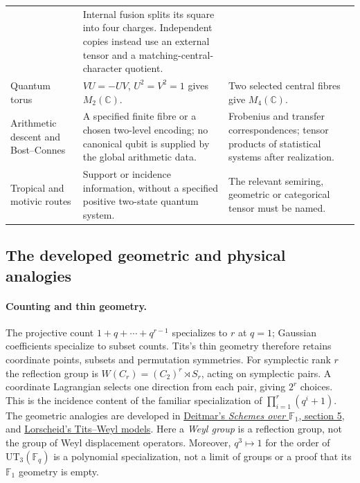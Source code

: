 \begin{longtable}{@{}p{3.1cm}p{5.1cm}p{6.5cm}@{}}
& Internal fusion splits its square into four charges. Independent copies
instead use an external tensor and a matching-central-character quotient.\\[3pt]
Quantum torus & $VU=-UV$, $U^2=V^2=1$ gives $M_2(\mathbb C)$.
& Two selected central fibres give $M_4(\mathbb C)$.\\[3pt]
Arithmetic descent and Bost--Connes & A specified finite fibre or a chosen
two-level encoding; no canonical qubit is supplied by the global arithmetic data.
& Frobenius and transfer correspondences; tensor products of statistical
systems after realization.\\[3pt]
Tropical and motivic routes & Support or incidence information, without a
specified positive two-state quantum system.
& The relevant semiring, geometric or categorical tensor must be named.\\
\bottomrule
\end{longtable}

\subsection{The developed geometric and physical analogies}

\paragraph{Counting and thin geometry.}
The projective count $1+q+\cdots+q^{r-1}$ specializes to $r$ at $q=1$;
Gaussian coefficients specialize to subset counts. Tits's thin geometry
therefore retains coordinate points, subsets and permutation symmetries.
For symplectic rank $r$ the reflection group is
$W(C_r)=(C_2)^r\rtimes S_r$, acting on symplectic pairs. A coordinate
Lagrangian selects one direction from each pair, giving $2^r$ choices.
This is the incidence content of the familiar specialization of
$\prod_{i=1}^r(q^i+1)$.
The geometric analogies are developed in
\href{https://arxiv.org/abs/math/0404185}{Deitmar's \emph{Schemes over
$\mathbb F_1$}, section 5}, and
\href{https://arxiv.org/abs/1201.1324}{Lorscheid's Tits--Weyl models}.
Here a \emph{Weyl group} is a reflection group, not the group of Weyl
displacement operators. Moreover, $q^3\mapsto1$ for the order of
$\mathrm{UT}_3(\mathbb F_q)$ is a polynomial specialization, not a limit
of groups or a proof that its $\mathbb F_1$ geometry is empty.

